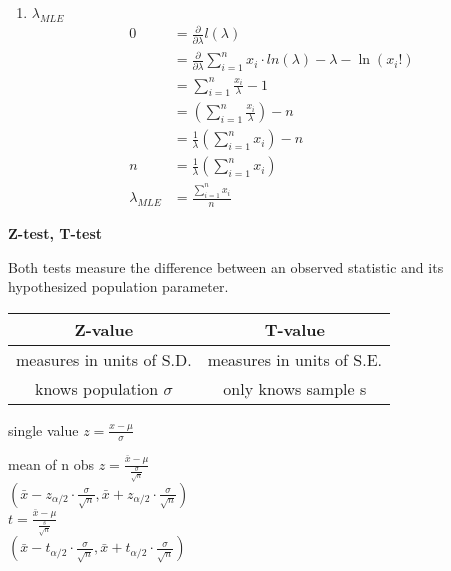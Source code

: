 \documentclass{article}
\begin{document}
\begin{small}
\begin{multicols}{2}
\begin{enumerate}
\item$\lambda_{MLE}$
\begin{align*}
0 & = \frac{\partial}{\partial\lambda}l(\lambda) \\
  & = \frac{\partial}{\partial\lambda} \sum_{i = 1}^{n} x_i \cdot ln(\lambda) - \lambda - \ln(x_i!) \\
  & = \sum_{i = 1}^{n} \frac{x_i}{\lambda} - 1 \\
  & = (\sum_{i = 1}^{n} \frac{x_i}{\lambda}) - n \\
  & = \frac{1}{\lambda}(\sum_{i = 1}^{n} x_i) - n \\
n & = \frac{1}{\lambda}(\sum_{i = 1}^{n} x_i) \\
\lambda_{MLE} & = \frac{\sum_{i = 1}^{n} x_i}{n}
\end{align*}

\end{enumerate}
\columnbreak

\textbf{Z-test, T-test}

Both tests measure the difference between an observed statistic and its hypothesized population parameter. 
\center\begin{tabular}{ |c|c| }
\hline 
Z-value & T-value \\
\hline
measures in units of S.D. & measures in units of S.E. \\
\hline
knows population $\sigma$ & only knows sample s\\
\hline

\hline
\end{tabular}

single value \large$z = \frac{x - \mu}{\sigma}$ \\

\begin{multicols}{2}
\small{mean of n obs} \large$z = \frac{\bar{x} - \mu}{\frac{\sigma}{\sqrt{n}}}$ \\
\small$(\bar{x} - z_{\alpha/2}\cdot\frac{\sigma}{\sqrt{n}}, \bar{x} + z_{\alpha/2}\cdot\frac{\sigma}{\sqrt{n}})$\\
\columnbreak
\large$t = \frac{\bar{x} - \mu}{\frac{s}{\sqrt{n}}}$\\

\small$(\bar{x} - t_{\alpha/2}\cdot\frac{\sigma}{\sqrt{n}}, \bar{x} + t_{\alpha/2}\cdot\frac{\sigma}{\sqrt{n}})$
\end{multicols}
\end{multicols}

\end{small}
\end{document}

